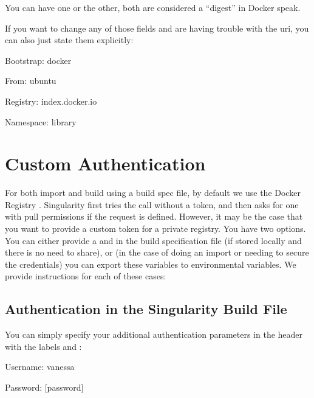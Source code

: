 \documentclass[letterpaper,10pt,english]{sphinxmanual}
\begin{document}
You can have one or the other, both are considered a “digest” in
Docker speak.

If you want to change any of those fields and are having trouble with
the uri, you can also just state them explicitly:

%
\begin{sphinxVerbatim}[commandchars=\\\{\}]
Bootstrap: docker

From: ubuntu

Registry: index.docker.io

Namespace: library
\end{sphinxVerbatim}


\section{Custom Authentication}
\label{\detokenize{singularity_and_docker:custom-authentication}}
For both import and build using a build spec file, by default we use
the Docker Registry  . Singularity first tries the call without a
token, and then asks for one with pull permissions if the request is
defined. However, it may be the case that you want to provide a custom
token for a private registry. You have two options. You can either
provide a  and  in the build specification file (if stored locally and
there is no need to share), or (in the case of doing an import or
needing to secure the credentials) you can export these variables to
environmental variables. We provide instructions for each of these
cases:


\subsection{Authentication in the Singularity Build File}
\label{\detokenize{singularity_and_docker:authentication-in-the-singularity-build-file}}
You can simply specify your additional authentication parameters in the
header with the labels  and  :

%
\begin{sphinxVerbatim}[commandchars=\\\{\}]
Username: vanessa

Password: [password]
\end{sphinxVerbatim}
\end{document}
